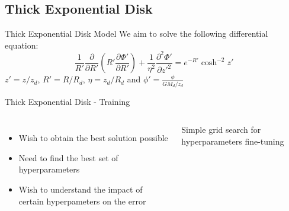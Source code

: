 \subsection{Thick Exponential Disk}\label{sec:disk}

\begin{frame}{Thick Exponential Disk Model}
    We aim to solve the following differential equation:
    \begin{equation*}
        \dfrac{1}{R'} \dfrac{\partial}{\partial R'} \left(R' \dfrac{\partial \Phi'}{\partial R'}\right) + \dfrac{1}{\eta^{2}}\dfrac{\partial^2 \Phi'}{\partial z'^2} = e^{-R'} \cosh^{-2}{z'}
\end{equation*} 
$z' = z/z_d$, $R' = R/R_d$, $\eta = z_d/R_d $ and $\phi'= \frac{\phi}{G M_d/z_d}$
\end{frame}

\begin{frame}{Thick Exponential Disk - Training}
    \begin{columns}
        \begin{itemize}
            \item Wish to obtain the best solution possible
            \item Need to find the best set of hyperparameters
            \item Wish to understand the impact of certain hyperpameters on the error

        \end{itemize}
        Simple grid search for hyperparameters fine-tuning
        \begin{table}[h]
        \centering
        \label{tab:fine-tuning}
        \end{table}
    \end{columns}
\end{frame}


